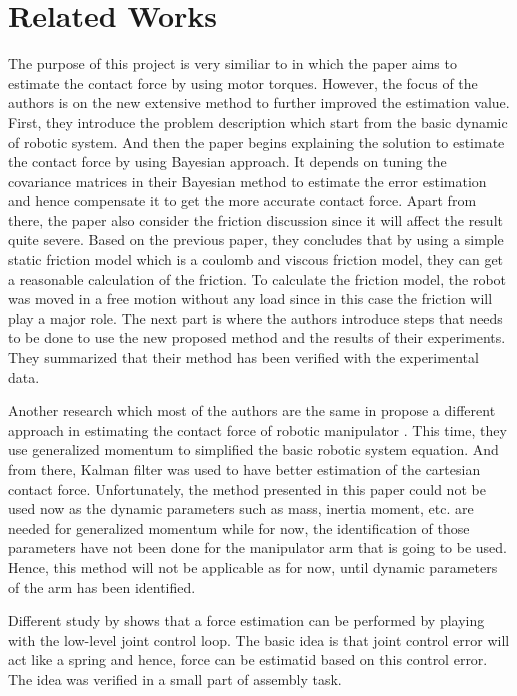 \section{Related Works}

The purpose of this project is very similiar to \cite{Hao14} in which the paper aims to estimate the contact force by using motor torques. However, the focus of the authors is on the new extensive method to further improved the estimation value. First, they introduce the problem description which start from the basic dynamic of robotic system. And then the paper begins explaining the solution to estimate the contact force by using Bayesian approach. It depends on tuning the covariance matrices in their Bayesian method to estimate the error estimation and hence compensate it to get the more accurate contact force. Apart from there, the paper also consider the friction discussion since it will affect the result quite severe. Based on the previous paper, they concludes that by using a simple static friction model which is a coulomb and viscous friction model, they can get a reasonable calculation of the friction. To calculate the friction model, the robot was moved in a free motion without any load since in this case the friction will play a major role. The next part is where the authors introduce steps that needs to be done to use the new proposed method and the results of their experiments. They summarized that their method has been verified with the experimental data.

Another research which most of the authors are the same in \cite{Hao14} propose a different approach in estimating the contact force of robotic manipulator \cite{Hao15}. This time, they use generalized momentum to simplified the basic robotic system equation. And from there, Kalman filter was used to have better estimation of the cartesian contact force. Unfortunately, the method presented in this paper could not be used now as the dynamic parameters such as mass, inertia moment, etc. are needed for generalized momentum while for now, the identification of those parameters have not been done for the manipulator arm that is going to be used. Hence, this method will not be applicable as for now, until dynamic parameters of the arm has been identified.


Different study by \cite{Stolt12} shows that a force estimation can be performed by playing with the low-level joint control loop. The basic idea is that joint control error will act like a spring and hence, force can be estimatid based on this control error. The idea was verified in a small part of assembly task. 


